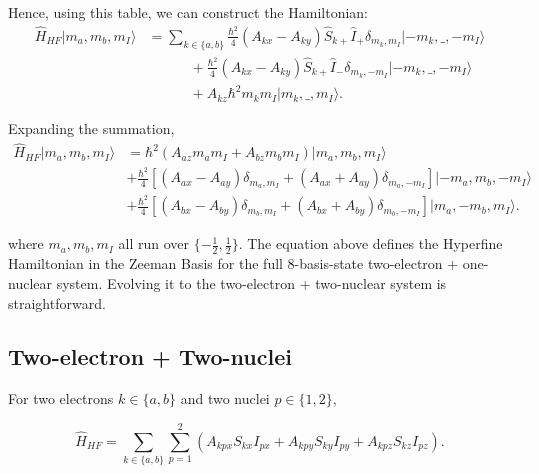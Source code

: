 \documentclass[svgnames]{article}
\begin{document}
Hence, using this table, we can construct the Hamiltonian: 
\begin{align*}
    \hat{H}_{HF}|m_a, m_b, m_I\rangle &= \sum_{k\in\{a, b\}} \frac{\hbar^2}{4}\left( A_{kx} - A_{ky}
    \right) \hat{S}_{k+}\hat{I}_+ \delta_{m_k, m_I}|-m_k, \_, -m_I\rangle \\ 
                                      &\quad\qquad+ \frac{\hbar^2}{4}\left( A_{kx} - A_{ky}
                                      \right) \hat{S}_{k+}\hat{I}_-\delta_{m_k,
                                      -m_I}|-m_k, \_, -m_I\rangle \\ 
                                      &\quad\qquad + A_{kz}\hbar^2m_k m_I |m_k, \_,
                                      m_I\rangle. 
\end{align*} 

Expanding the summation, 
\begin{align*}
    \hat{H}_{HF}|m_a, m_b, m_I\rangle &= \hbar^2\left( A_{az}m_a m_I +
    A_{bz}m_bm_I \right) |m_a, m_b, m_I\rangle \\ 
                                      &+ \frac{\hbar^2}{4} \left[ \left( A_{ax}
                                          - A_{ay} \right) \delta_{m_a, m_I} +
                                          \left( A_{ax} + A_{ay} \right)
                                      \delta_{m_a, -m_I}\right] |-m_a, m_b,
                                      -m_I\rangle \\ 
                                      &+ \frac{\hbar^2}{4}\left[ \left( A_{bx} -
                                      A_{by} \right) \delta_{m_b, m_I} + \left(
                              A_{bx} + A_{by} \right) \delta_{m_b, -m_I} \right]
                              |m_a, -m_b, m_I\rangle. 
\end{align*}

where $m_a, m_b, m_I$ all run over $\{-\frac{1}{2}, \frac{1}{2}\}$. The equation
above defines the Hyperfine Hamiltonian in the Zeeman Basis for the full
8-basis-state two-electron + one-nuclear system. Evolving it to the two-electron + two-nuclear
system is straightforward. 

\subsection{Two-electron + Two-nuclei}

For two electrons $k\in\{a, b\}$ and two nuclei $p\in\{1, 2\}$, 

 \[
     \hat{H}_{HF} = \sum_{k\in\{a, b\}}^{} \sum_{p=1}^2 \left(
     A_{kpx}S_{kx}I_{px} + A_{kpy}S_{ky}I_{py} + A_{kpz}S_{kz}I_{pz} \right).   
\] \vspace{3px}
\end{document}
